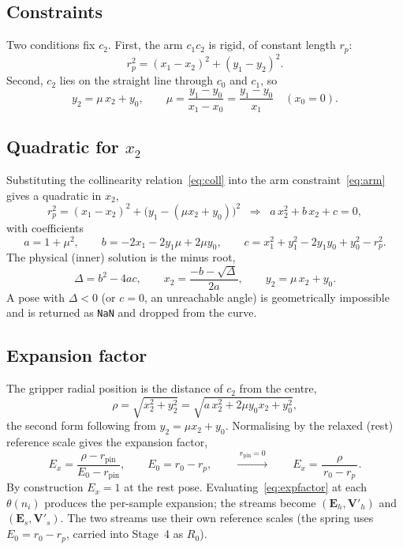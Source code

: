 \documentclass[11pt]{article}
\newcommand{\dset}[1]{\mathbf{#1}}          %
\begin{document}
\subsection{Constraints}
Two conditions fix $c_2$. First, the arm $c_1c_2$ is rigid, of constant length $r_p$:
\begin{equation}
r_p^2=(x_1-x_2)^2+(y_1-y_2)^2 .
\label{eq:arm}
\end{equation}
Second, $c_2$ lies on the straight line through $c_0$ and $c_1$, so
\begin{equation}
y_2=\mu\,x_2+y_0,
\qquad
\mu=\frac{y_1-y_0}{x_1-x_0}=\frac{y_1-y_0}{x_1}\quad(x_0=0).
\label{eq:coll}
\end{equation}

\subsection{Quadratic for \texorpdfstring{$x_2$}{x2}}
Substituting the collinearity relation~\eqref{eq:coll} into the arm constraint~\eqref{eq:arm}
gives a quadratic in $x_2$,
\begin{equation}
r_p^2=(x_1-x_2)^2+\bigl(y_1-(\mu x_2+y_0)\bigr)^2
\;\;\Longrightarrow\;\;
a\,x_2^2+b\,x_2+c=0,
\end{equation}
with coefficients
\begin{equation}
a=1+\mu^2,
\qquad
b=-2x_1-2y_1\mu+2\mu y_0,
\qquad
c=x_1^2+y_1^2-2y_1 y_0+y_0^2-r_p^2 .
\end{equation}
The physical (inner) solution is the minus root,
\begin{equation}
\Delta=b^2-4ac,
\qquad
x_2=\frac{-b-\sqrt{\Delta}}{2a},
\qquad
y_2=\mu\,x_2+y_0 .
\end{equation}
A pose with $\Delta<0$ (or $c=0$, an unreachable angle) is geometrically impossible and is
returned as \texttt{NaN} and dropped from the curve.

\subsection{Expansion factor}
The gripper radial position is the distance of $c_2$ from the centre,
\begin{equation}
\rho=\sqrt{x_2^2+y_2^2}=\sqrt{a\,x_2^2+2\mu y_0 x_2+y_0^2},
\end{equation}
the second form following from $y_2=\mu x_2+y_0$. Normalising by the relaxed (rest) reference
scale gives the expansion factor,
\begin{equation}
E_x=\frac{\rho-r_{\mathrm{pin}}}{E_0-r_{\mathrm{pin}}},
\qquad
E_0=r_0-r_p,
\qquad\xrightarrow{\;r_{\mathrm{pin}}=0\;}\qquad
E_x=\frac{\rho}{\,r_0-r_p\,}.
\label{eq:expfactor}
\end{equation}
By construction $E_x=1$ at the rest pose. Evaluating~\eqref{eq:expfactor} at each $\theta(n_i)$
produces the per-sample expansion; the streams become $(\dset{E}_h,\dset{V}'_h)$ and
$(\dset{E}_s,\dset{V}'_s)$. The two streams use their own reference scales (the spring uses
$E_0=r_0-r_p$, carried into Stage~4 as $R_0$).
\end{document}
